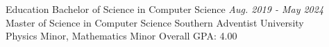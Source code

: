 \begin{rSection}{Education}
	Bachelor of Science in Computer Science \hfill {\em Aug. 2019 - May 2024}\\
	Master of Science in Computer Science \hfill {Southern Adventist University}\\
	Physics Minor, Mathematics Minor \hfill {Overall GPA: 4.00}\\
\end{rSection}